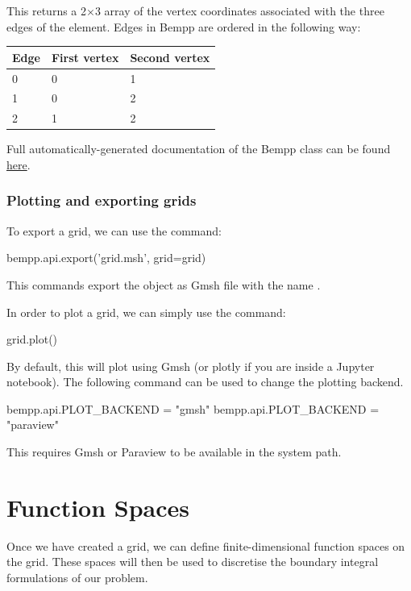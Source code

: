 \documentclass[a4paper]{book}
\begin{document}
This returns a 2$\times$3 array of the vertex coordinates associated
with the three edges of the element.
Edges in Bempp are ordered in the following way:

\begin{center}
\begin{tabular}{|l|l|l|}
\hline
Edge & First vertex & Second vertex\\
\hline
 0   &  0           &  1\\
 1   &  0           &  2\\
 2   &  1           &  2\\
\hline
\end{tabular}
\end{center}
Full automatically-generated documentation of the Bempp  class can be found
\href{https://bempp-cl.readthedocs.io/en/latest/docs/bempp/api/grid/grid/index.html#bempp.api.grid.grid.Grid}{here}.

\subsection{ Plotting and exporting grids}To export a grid, we can use the  command:

\begin{python}
bempp.api.export('grid.msh', grid=grid)
\end{python}

This commands export the object  as Gmsh file with the
name .

In order to plot a grid, we can simply use the command:

\begin{python}
grid.plot()
\end{python}

By default, this will plot using Gmsh (or plotly if you are inside a Jupyter notebook).
The following command can be used to change the plotting backend.

\begin{python}
bempp.api.PLOT_BACKEND = "gmsh"
bempp.api.PLOT_BACKEND = "paraview"
\end{python}

This requires Gmsh or Paraview to be available in the system path.


\chapter{Function Spaces}


Once we have created a grid, we can define finite-dimensional function spaces
on the grid. These spaces will then be used to discretise the boundary integral
formulations of our problem.
\end{document}
